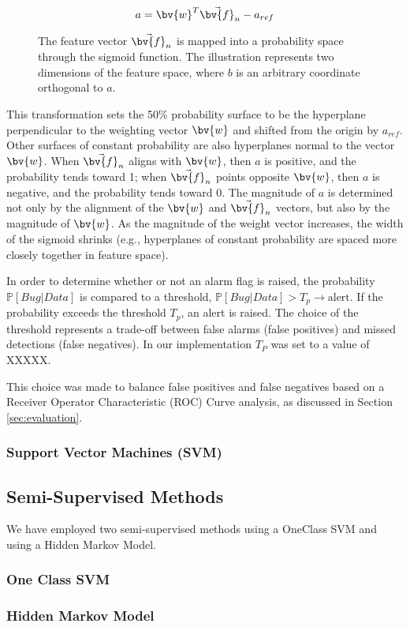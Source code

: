 \begin{equation}
  \label{e:logreg}
  a = \bv{w}^T \vec{\bv{f}}_n - a_{ref}
\end{equation}

\begin{figure}[h]
  \caption{The feature vector $\vec{\bv{f}}_n$ is mapped into a probability
    space through the sigmoid function. The illustration represents
    two dimensions of the feature space, where $b$ is an arbitrary
    coordinate orthogonal to $a$.}
  \label{fig:sigmoid}
\end{figure}

This transformation sets the 50\% probability surface to be the
hyperplane perpendicular to the weighting vector $\bv{w}$ and shifted
from the origin by $a_{ref}$.  Other surfaces of constant probability
are also hyperplanes normal to the vector $\bv{w}$.  When $\vec{\bv{f}}_n$
aligns with $\bv{w}$, then $a$ is positive, and the probability tends
toward 1; when $\vec{\bv{f}}_n$ points opposite $\bv{w}$, then $a$ is
negative, and the probability tends toward 0.  The magnitude of $a$ is
determined not only by the alignment of the $\bv{w}$ and
$\vec{\bv{f}}_n$ vectors, but
also by the magnitude of $\bv{w}$.  As the magnitude of the weight
vector increases, the width of the sigmoid shrinks (e.g., hyperplanes
of constant probability are spaced more closely together in feature
space).

In order to determine whether or not an alarm flag is raised, the
probability $\mathbb{P}[Bug | Data]$ is compared to a threshold, $\mathbb{P}[Bug | Data]
> T_p \to \text{alert}$. If the probability exceeds the threshold
$T_p$, an alert is raised. The choice of the threshold represents a
trade-off between false alarms (false positives) and missed detections
(false negatives). In our implementation $T_P$ was set to a
value of XXXXX.


This choice was made to balance false positives and
false negatives based on a Receiver Operator Characteristic (ROC)
Curve analysis, as discussed in Section \ref{sec:evaluation}.

\subsubsection{Support Vector Machines (SVM)}

\subsection{Semi-Supervised Methods}

We have employed two semi-supervised methods using a OneClass SVM and
using a Hidden Markov Model.

\subsubsection{One Class SVM}


\subsubsection{Hidden Markov Model}
